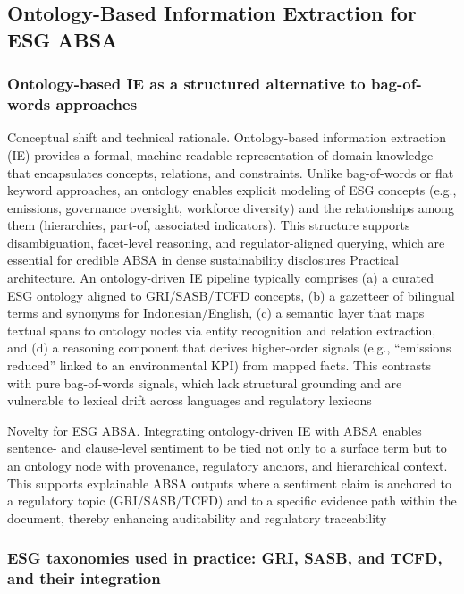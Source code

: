 \subsection{Ontology-Based Information Extraction for ESG ABSA}

\subsubsection{Ontology-based IE as a structured alternative to bag-of-words approaches}

Conceptual shift and technical rationale. Ontology-based information extraction (IE) provides a formal, machine-readable representation of domain knowledge that encapsulates concepts, relations, and constraints. Unlike bag-of-words or flat keyword approaches, an ontology enables explicit modeling of ESG concepts (e.g., emissions, governance oversight, workforce diversity) and the relationships among them (hierarchies, part-of, associated indicators). This structure supports disambiguation, facet-level reasoning, and regulator-aligned querying, which are essential for credible ABSA in dense sustainability disclosures \cite{10.2139/ssrn.3738629,10.20944/preprints202407.2036.v1,10.7849/ksnre.2022.0010,10.47473/2020rmm0103}
Practical architecture. An ontology-driven IE pipeline typically comprises (a) a curated ESG ontology aligned to GRI/SASB/TCFD concepts, (b) a gazetteer of bilingual terms and synonyms for Indonesian/English, (c) a semantic layer that maps textual spans to ontology nodes via entity recognition and relation extraction, and (d) a reasoning component that derives higher-order signals (e.g., “emissions reduced” linked to an environmental KPI) from mapped facts. This contrasts with pure bag-of-words signals, which lack structural grounding and are vulnerable to lexical drift across languages and regulatory lexicons \cite{10.7849/ksnre.2022.0010,10.47473/2020rmm0103}

Novelty for ESG ABSA. Integrating ontology-driven IE with ABSA enables sentence- and clause-level sentiment to be tied not only to a surface term but to an ontology node with provenance, regulatory anchors, and hierarchical context. This supports explainable ABSA outputs where a sentiment claim is anchored to a regulatory topic (GRI/SASB/TCFD) and to a specific evidence path within the document, thereby enhancing auditability and regulatory traceability \cite{10.20944/preprints202407.2036.v1,10.47473/2020rmm0103}
\subsubsection{ESG taxonomies used in practice: GRI, SASB, and TCFD, and their integration}

